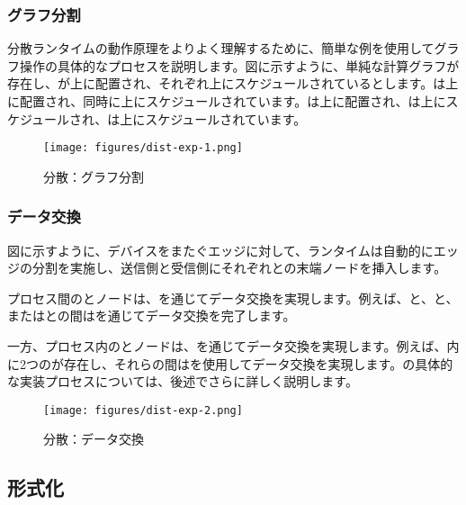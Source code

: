 \begin{content}
\subsubsection{グラフ分割}

分散ランタイムの動作原理をよりよく理解するために、簡単な例を使用してグラフ操作の具体的なプロセスを説明します。図に示すように、単純な計算グラフが存在し、が上に配置され、それぞれ上にスケジュールされているとします。は上に配置され、同時に上にスケジュールされています。は上に配置され、は上にスケジュールされ、は上にスケジュールされています。

\begin{figure}[H]
\centering
\texttt{[image: figures/dist-exp-1.png]}
\caption{分散：グラフ分割}
 \label{fig:dist-exp-1}
\end{figure}

\subsubsection{データ交換}

図に示すように、デバイスをまたぐエッジに対して、ランタイムは自動的にエッジの分割を実施し、送信側と受信側にそれぞれとの末端ノードを挿入します。

プロセス間のとノードは、を通じてデータ交換を実現します。例えば、と、と、またはとの間はを通じてデータ交換を完了します。

一方、プロセス内のとノードは、を通じてデータ交換を実現します。例えば、内に2つのが存在し、それらの間はを使用してデータ交換を実現します。の具体的な実装プロセスについては、後述でさらに詳しく説明します。

\begin{figure}[H]
\centering
\texttt{[image: figures/dist-exp-2.png]}
\caption{分散：データ交換}
 \label{fig:dist-exp-2}
\end{figure}

\subsection{形式化}


\end{content}
